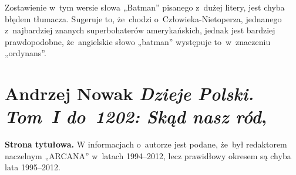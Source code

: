 \documentclass[a4paper,11pt]{article}
\numberwithin{equation}{section}
\begin{document}
\VerSpaceFour





 Zostawienie w~tym wersie słowa „Batman”
pisanego z~dużej litery, jest chyba błędem tłumacza. Sugeruje to,
że~chodzi o~Człowieka-Nietoperza, jednanego z~najbardziej
znanych superbohaterów amerykańskich, jednak jest bardziej
prawdopodobne, że~angielskie słowo „batman” występuje to~w~znaczeniu
„ordynans”.











\VerSpaceTwo










\section{ %
  Andrzej Nowak \textit{Dzieje Polski. Tom~I do~1202: Skąd
    nasz ród},
  \cite{NowakDziejePolskiVolI2014} }




\textbf{Strona tytułowa.} W informacjach o~autorze jest podane,
że~był redaktorem naczelnym „ARCANA” w~latach 1994--2012, lecz
prawidłowy okresem są chyba lata 1995--2012.

\VerSpaceFour
\end{document}
